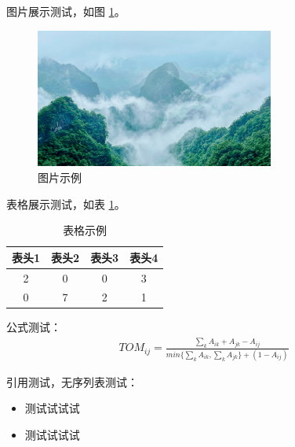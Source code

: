 \documentclass[
    report,     %
    oneside,    %
    UTF8,       %
    zihao=-4    %
]{config} %
\begin{document}
图片展示测试，如图 \ref{fig:example}。

\begin{figure}[H] %
	\centering %
	\includegraphics[width=0.7\textwidth]{figures/example1.jpg}
	\caption{图片示例} %
	\label{fig:example} %
\end{figure}
\vspace{-0.7em}  %


表格展示测试，如表 \ref{tab:example}。

\begin{table}[H] %
    \centering
    \caption{表格示例} %
    \renewcommand\arraystretch{0.85} %
    \label{tab:example} %
\begin{tabular}{@{}cccc@{}}
\toprule
\textbf{表头1} & \textbf{表头2} & \textbf{表头3} & \textbf{表头4} \\ \midrule
2    & 0     & 0    & 3    \\
0    & 7     & 2    & 1    \\ \bottomrule
\end{tabular}
\end{table}
\vspace{-0.5em}  %


公式测试：
\abovedisplayshortskip=4pt
\belowdisplayshortskip=7pt
\abovedisplayskip=4pt
\belowdisplayskip=7pt
\begin{gather*}%
TOM_{ij} = \frac{ \sum_k A_{ik} + A_{jk} - A_{ij} }{ min\{ \sum_k A_{ik}, \sum_k A_{jk} \} + (1 - A_{ij}) }
\end{gather*}


引用测试\cite{mao2021correlation}，无序列表测试：

\begin{itemize}[itemsep=2pt,topsep=1pt,parsep=1pt] %

\item 测试试试试
\item 测试试试试

\end{itemize}
\end{document}
